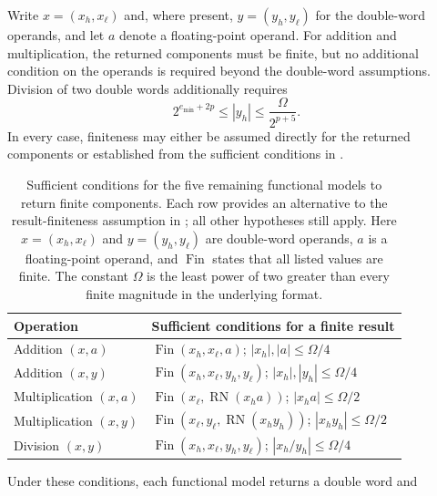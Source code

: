 Write $x=(x_h,x_\ell)$ and, where present, $y=(y_h,y_\ell)$ for the
double-word operands, and let $a$ denote a floating-point operand. For
addition and multiplication, the returned components must be finite, but no
additional condition on the operands is required beyond the double-word
assumptions. Division of two double words additionally requires
%
\begin{equation}
  2^{e_{\min}+2p}
  \leq |y_h|
  \leq \frac{\Omega}{2^{p+5}}.
  \label{eq:dw-div-dw-divisor-condition}
\end{equation}
%
In every case, finiteness may either be assumed directly for the returned
components or established from the sufficient conditions in
.
%
\begin{table}[t]
\centering
\caption{Sufficient conditions for the five remaining functional
models to return finite components. Each row provides an
alternative to the result-finiteness assumption in
; all other hypotheses
still apply. Here $x=(x_h,x_\ell)$ and $y=(y_h,y_\ell)$ are
double-word operands, $a$ is a floating-point operand, and
$\operatorname{Fin}$ states that all listed values are finite.
The constant $\Omega$ is the least power of two greater than
every finite magnitude in the underlying format.}
\label{tab:remaining-numerical-conditions}
\setlength{\tabcolsep}{3pt}
\begin{tabular}{@{}p{}p{}@{}}
\toprule
Operation & Sufficient conditions for a finite result \\
\midrule
Addition $(x,a)$
  & $\operatorname{Fin}(x_h,x_\ell,a)$;
    $|x_h|,|a|\leq\Omega/4$ \\
\addlinespace
Addition $(x,y)$
  & $\operatorname{Fin}(x_h,x_\ell,y_h,y_\ell)$;
    $|x_h|,|y_h|\leq\Omega/4$ \\
\addlinespace
Multiplication $(x,a)$
  & $\operatorname{Fin}(x_\ell,\operatorname{RN}(x_h a))$;
    $|x_h a|\leq\Omega/2$ \\
\addlinespace
Multiplication $(x,y)$
  & $\operatorname{Fin}(x_\ell,y_\ell,\operatorname{RN}(x_h y_h))$;
    $|x_h y_h|\leq\Omega/2$ \\
\addlinespace
Division $(x,y)$
  & $\operatorname{Fin}(x_h,x_\ell,y_h,y_\ell)$;
    $|x_h/y_h|\leq\Omega/4$ \\
\bottomrule
\end{tabular}
\end{table}
%
Under these conditions, each functional model returns a double word and
